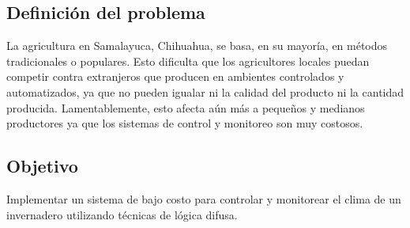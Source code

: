 

\subsection{Definición del problema}





La agricultura en Samalayuca, Chihuahua, se basa, en su mayoría, en métodos tradicionales o populares. Esto dificulta que los agricultores
locales puedan competir contra extranjeros que producen en ambientes controlados y automatizados, ya que no pueden igualar ni la calidad 
del producto ni la cantidad producida. Lamentablemente, esto afecta aún más a pequeños y medianos productores ya que los sistemas de control 
y monitoreo son muy costosos.



\subsection{Objetivo}
Implementar un sistema de bajo costo para controlar y monitorear el clima de un invernadero utilizando técnicas de lógica difusa.